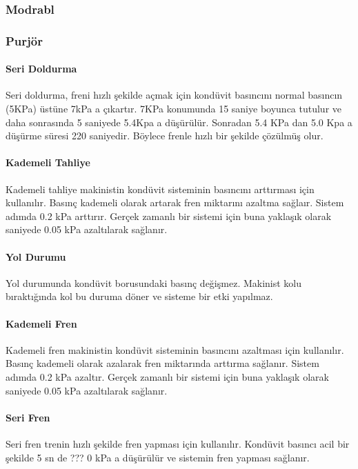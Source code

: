 \documentclass[10pt,a4paper]{article}
\begin{document}
\subsubsection{Modrabl}

\subsubsection{Purjör}


\paragraph{Seri Doldurma}
Seri doldurma, freni hızlı şekilde açmak için kondüvit basıncını normal basıncın (5KPa) üstüne 7kPa a çıkartır. 7KPa konumunda 15 saniye boyunca tutulur ve daha sonrasında 5 saniyede 5.4Kpa a düşürülür. Sonradan 5.4 KPa dan 5.0 Kpa a düşürme süresi 220 saniyedir. Böylece frenle hızlı bir şekilde çözülmüş olur.
\paragraph{Kademeli Tahliye}
Kademeli tahliye makinistin kondüvit sisteminin basıncını arttırması için kullanılır. Basınç kademeli olarak artarak fren miktarını azaltma sağlaır. Sistem adımda 0.2 kPa arttırır. Gerçek zamanlı bir sistemi için buna yaklaşık olarak saniyede 0.05 kPa azaltılarak sağlanır.
\paragraph{Yol Durumu}
Yol durumunda kondüvit borusundaki basınç değişmez. Makinist kolu bıraktığında kol bu duruma döner ve sisteme bir etki yapılmaz.
\paragraph{Kademeli Fren}
Kademeli fren makinistin kondüvit sisteminin basıncını azaltması için kullanılır. Basınç kademeli olarak azalarak fren miktarında arttırma sağlanır. Sistem adımda 0.2 kPa azaltır. Gerçek zamanlı bir sistemi için buna yaklaşık olarak saniyede 0.05 kPa azaltılarak sağlanır.
\paragraph{Seri Fren}
Seri fren trenin hızlı şekilde fren yapması için kullanılır. Kondüvit basıncı acil bir şekilde 5 sn de ??? 0 kPa a düşürülür ve sistemin fren yapması sağlanır.

\newpage
\end{document}
